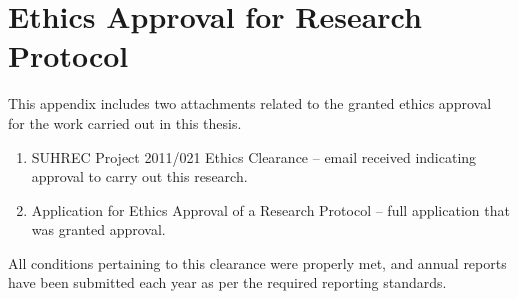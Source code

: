 
\chapter{Ethics Approval for Research Protocol} %
\label{cha:ethics_protocol}

This appendix includes two attachments related to the granted ethics approval for the work carried out in this thesis. 
\begin{enumerate}
	\item SUHREC Project 2011/021 Ethics Clearance -- email received indicating approval to carry out this research.
	\item Application for Ethics Approval of a Research Protocol -- full application that was granted approval.
\end{enumerate}

All conditions pertaining to this clearance were properly met, and annual reports have been submitted each year as per the required reporting standards.

\graphicspath{{Figures/Appendix/}}



